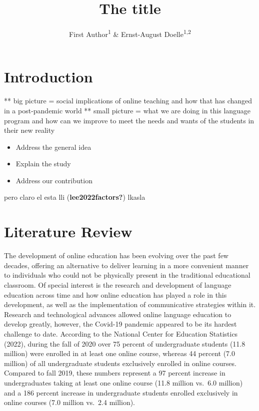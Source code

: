 \documentclass[
  man]{apa6}
\title{The title}
\author{First Author\textsuperscript{1} \& Ernst-August Doelle\textsuperscript{1,2}}
\date{}
\affiliation{\vspace{0.5cm}\textsuperscript{1} Wilhelm-Wundt-University\\\textsuperscript{2} Konstanz Business School}
\begin{document}
\maketitle

\hypertarget{introduction}{%
\section{Introduction}\label{introduction}}

** big picture = social implications of online teaching and how that has changed in a post-pandemic world
** small picture = what we are doing in this language program and how can we improve to meet the needs and wants of the students in their new reality

\begin{itemize}
\item
  Address the general idea
\item
  Explain the study
\item
  Address our contribution
\end{itemize}

pero claro el esta lli (\textbf{lee2022factors?}) lkasla

\hypertarget{literature-review}{%
\section{Literature Review}\label{literature-review}}

The development of online education has been evolving over the past few decades, offering an alternative to deliver learning in a more convenient manner to individuals who could not be physically present in the traditional educational classroom. Of special interest is the research and development of language education across time and how online education has played a role in this development, as well as the implementation of communicative strategies within it. Research and technological advances allowed online language education to develop greatly, however, the Covid-19 pandemic appeared to be its hardest challenge to date. According to the National Center for Education Statistics (2022), during the fall of 2020 over 75 percent of undergraduate students (11.8 million) were enrolled in at least one online course, whereas 44 percent (7.0 million) of all undergraduate students exclusively enrolled in online courses. Compared to fall 2019, these numbers represent a 97 percent increase in undergraduates taking at least one online course (11.8 million vs.~6.0 million) and a 186 percent increase in undergraduate students enrolled exclusively in online courses (7.0 million vs.~2.4 million).
\end{document}
